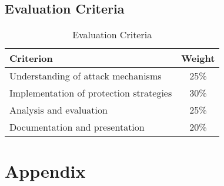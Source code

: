\documentclass[12pt]{article}
\begin{document}
\subsection{Evaluation Criteria}

\begin{table}[H]
\centering
\begin{tabular}{|l|c|}
\hline
\textbf{Criterion} & \textbf{Weight} \\
\hline
Understanding of attack mechanisms & 25\% \\
\hline
Implementation of protection strategies & 30\% \\
\hline
Analysis and evaluation & 25\% \\
\hline
Documentation and presentation & 20\% \\
\hline
\end{tabular}
\caption{Evaluation Criteria}
\label{tab:evaluation}
\end{table}

\section{Appendix}
\end{document}
